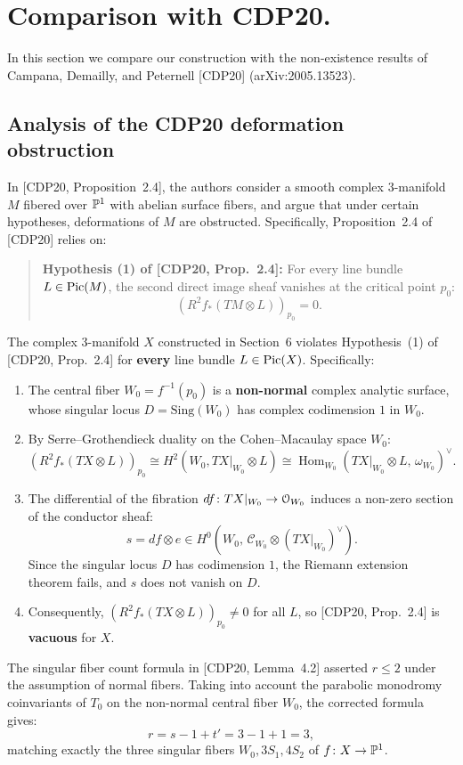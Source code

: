 \section{Comparison with CDP20.}

In this section we compare our construction with the non-existence results of Campana, Demailly, and Peternell [CDP20] (arXiv:2005.13523).

\subsection{Analysis of the CDP20 deformation obstruction}

In [CDP20, Proposition~2.4], the authors consider a smooth complex $3$-manifold $M$ fibered over $\mathbb{P}^1$ with abelian surface fibers, and argue that under certain hypotheses, deformations of $M$ are obstructed.
Specifically, Proposition~2.4 of [CDP20] relies on:
\begin{quote}
\textbf{Hypothesis (1) of [CDP20, Prop.~2.4]:}
For every line bundle $L \in \mathrm{Pic}(M)$, the second direct image sheaf vanishes at the critical point $p_0$:
\[
(R^2 f_*(TM \otimes L))_{p_0} = 0.
\]
\end{quote}

\begin{theorem}\label{thm:cdp-failure}
The complex $3$-manifold $X$ constructed in Section~6 violates Hypothesis~(1) of [CDP20, Prop.~2.4] for \textbf{every} line bundle $L \in \mathrm{Pic}(X)$.
Specifically:
\begin{enumerate}[label=(\roman*)]
    \item The central fiber $W_0 = f^{-1}(p_0)$ is a \textbf{non-normal} complex analytic surface, whose singular locus $D = \mathrm{Sing}(W_0)$ has complex codimension $1$ in $W_0$.
    \item By Serre--Grothendieck duality on the Cohen--Macaulay space $W_0$:
    \[
    (R^2 f_*(TX \otimes L))_{p_0} \cong H^2(W_0, TX|_{W_0} \otimes L) \cong \operatorname{Hom}_{W_0}(TX|_{W_0} \otimes L, \, \omega_{W_0})^\vee.
    \]
    \item The differential of the fibration $df \colon TX|_{W_0} \to \mathcal{O}_{W_0}$ induces a non-zero section of the conductor sheaf:
    \[
    s = df \otimes e \in H^0(W_0, \, \mathscr{C}_{W_0} \otimes (TX|_{W_0})^\vee).
    \]
    Since the singular locus $D$ has codimension $1$, the Riemann extension theorem fails, and $s$ does not vanish on $D$.
    \item Consequently, $(R^2 f_*(TX \otimes L))_{p_0} \ne 0$ for all $L$, so [CDP20, Prop.~2.4] is \textbf{vacuous} for $X$.
\end{enumerate}
\end{theorem}

\begin{theorem}\label{thm:cdp-count}
The singular fiber count formula in [CDP20, Lemma~4.2] asserted $r \le 2$ under the assumption of normal fibers.
Taking into account the parabolic monodromy coinvariants of $T_0$ on the non-normal central fiber $W_0$, the corrected formula gives:
\[
r = s - 1 + t' = 3 - 1 + 1 = 3,
\]
matching exactly the three singular fibers $W_0, 3S_1, 4S_2$ of $f \colon X \to \mathbb{P}^1$.
\end{theorem}
